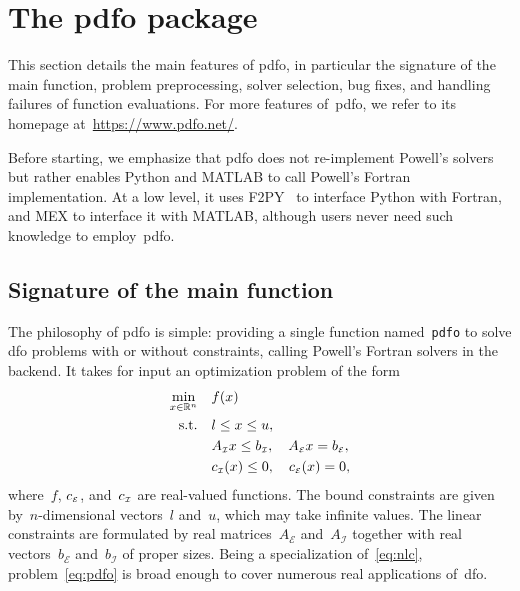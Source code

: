 \documentclass[
    smallextended,  %
    final,        %
]{svjour3}
\newcommand{\R}{\mathbb{R}}
\newcommand{\aeq}{A_{\scriptscriptstyle\mathcal{E}}}
\newcommand{\aub}{A_{\scriptscriptstyle\mathcal{I}}}
\newcommand{\beq}{b_{\scriptscriptstyle\mathcal{E}}}
\newcommand{\bub}{b_{\scriptscriptstyle\mathcal{I}}}
\newcommand{\ceq}{\con[\scriptscriptstyle\mathcal{E}]}
\newcommand{\con}[1][i]{c\ifthenelse{\equal{#1}{}}{}{_{#1}}}
\newcommand{\cub}{\con[\scriptscriptstyle\mathcal{I}]}
\newcommand{\obj}{f}
\newcommand{\st}{\text{s.t.}}
\newcommand{\xl}{l}
\newcommand{\xu}{u}
\newcommand{\pdfofun}{\texttt{pdfo}\xspace}
\begin{document}
\section{The \gls{pdfo} package}
\label{sec:pdfo}

This section details the main features of \gls{pdfo}, in particular the signature of the main
function, problem preprocessing, solver selection, bug fixes, and handling failures of function
evaluations. For more features of~\gls{pdfo}, we refer to its homepage
at~\url{https://www.pdfo.net/}.

Before starting, we
emphasize that \gls{pdfo} does not re-implement Powell’s solvers but rather enables Python and MATLAB
to call Powell's Fortran implementation.
At a low level, it uses F2PY~\cite{Peterson_2009} to interface Python with Fortran, and MEX to
interface it with MATLAB, although users never need such knowledge to employ~\gls{pdfo}.

\subsection{Signature of the main function}

The philosophy of \gls{pdfo} is simple: providing a single function named~\pdfofun to solve
\gls{dfo} problems with or without constraints, calling Powell's Fortran solvers in the backend.
It takes for input an optimization problem of the form
\begin{subequations}
    \label{eq:pdfo}
    \begin{align}
        \min_{x \in \R^n}   & \quad \obj(x)\\
        \st                 & \quad \xl \le x \le \xu, \label{eq:pdfo-b}\\
                            & \quad \aub x \le \bub, \quad \aeq x = \beq, \label{eq:pdfo-l}\\
                            & \quad \cub(x) \le 0, \quad \ceq(x) = 0, \label{eq:pdfo-nl}
    \end{align}
\end{subequations}
where~$\obj$, $\ceq$, and~$\cub$ are real-valued functions. The bound constraints are given
by~$n$-dimensional vectors~$\xl$ and~$\xu$, which may take infinite values. The linear constraints
are formulated by real matrices~$\aeq$ and~$\aub$ together with real vectors~$\beq$ and~$\bub$ of
proper sizes. Being a specialization of~\eqref{eq:nlc}, problem~\eqref{eq:pdfo} is broad enough to
cover numerous real applications of~\gls{dfo}.
\end{document}
